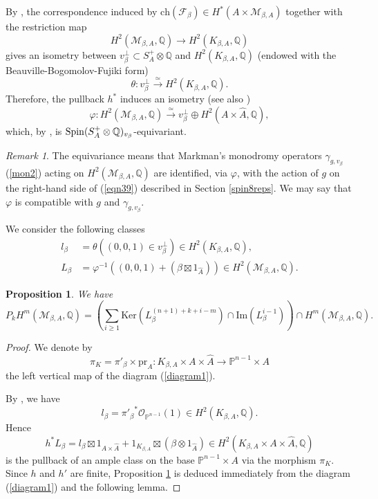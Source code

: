 \documentclass[11pt]{amsart}
\theoremstyle{plain}
\newtheorem{prop}[thm]{Proposition}
\theoremstyle{definition}
\theoremstyle{remark}
\newtheorem{rmk}[thm]{Remark}
\newcommand{\BP}{{\mathbb{P}}}
\newcommand{\BQ}{{\mathbb{Q}}}
\newcommand{\CF}{{\mathcal F}}
\newcommand{\CM}{{\mathcal M}}
\newcommand{\CO}{{\mathcal O}}
\begin{document}
By \cite[Theorem 0.1 and (1.6)]{Yo}, the correspondence induced by $\mathrm{ch}(\CF_\beta) \in H^*(A \times \CM_{\beta,A})$ together with the restriction map
\[
H^2(\CM_{\beta,A}, \BQ) \to H^2(K_{\beta,A}, \BQ)
\]
gives an isometry between $v_\beta^\perp \subset S_A^+\otimes \BQ$ and $H^2(K_{\beta,A}, \BQ)$  (endowed with the Beauville-Bogomolov-Fujiki form)
\[
\theta: v_\beta^\perp  \xrightarrow{\simeq}  H^2(K_{\beta,A}, \BQ).
\]
{Therefore, the pullback $h^*$ induces an isometry 
 (see also \cite[Theorem 4.1.(3) eq. (4.3)]{Yo})}
\begin{equation}\label{eqn39}
\varphi: H^2(\CM_{\beta, A}, \BQ) \xrightarrow{\simeq} v_\beta^\perp \oplus H^2(A\times \hat{A}, \BQ),
\end{equation}
which, by \cite[Section 8]{Markman2}, is  ${\rm Spin} (S_A^+\otimes \BQ)_{v_\beta}$-equivariant.
{
\begin{rmk}\label{compatibilityspin} The equivariance means  that 
Markman's monodromy operators $\gamma_{g,v_\beta}$ (\ref{mon2}) acting on 
$H^2(\CM_{\beta, A}, \BQ)$ are identified, via $\varphi$, with the action of $g$ on the
right-hand side of (\ref{eqn39})  described in Section \ref{spin8reps}. We may say that $\varphi$ is compatible with $g$ and $\gamma_{g,v_\beta}$.
\end{rmk}
}

We consider the following classes 
\begin{equation}\label{Lbeta}
\begin{split}
    l_\beta & = \theta\left((0,0,1)\in v_\beta^\perp\right) \in H^2(K_{\beta,A} ,\BQ), \\
    L_\beta & = \varphi^{-1} \left( (0,0,1) +  (\beta\boxtimes 1_{\hat{A}}) \right) \in H^2(\CM_{\beta, A}, \BQ).
\end{split}
\end{equation}

\begin{prop}\label{prop2.4}
We have  
\[
P_kH^m(\CM_{\beta,A}, \BQ) = \left(\sum_{i\geq 1} \mathrm{Ker}\left(L_\beta^{(n+1)+k+i-m}\right) \cap \mathrm{Im}(L_\beta^{i-1}) \right) \cap H^m(\CM_{\beta,A}, \BQ).
\]
\end{prop}

\begin{proof}
We denote by 
\[
\pi_K = \pi'_\beta \times \mathrm{pr}_A : K_{\beta, A} \times A \times \hat{A} \to \BP^{n-1}\times A
\]
the left vertical map of the diagram (\ref{diagram1}). 

By \cite[Example 3.1]{Markman4}, we have  
\[
l_\beta = {\pi'_\beta}^\ast \CO_{\BP^{n-1}}(1) \in H^2(K_{\beta,A}, \BQ).
\]
Hence 
\[
h^*L_\beta = l_\beta \boxtimes 1_{A\times\hat{A}}+ 1_{K_{\beta,A}}\boxtimes (\beta\otimes 1_{\hat{A}}) \in H^2(K_{\beta, A} \times A \times \hat{A},\BQ)
\]
is the pullback of an ample class on the base $\BP^{n-1}\times A$ via the morphism $\pi_K$. Since $h$ and $h'$ are finite, Proposition \ref{prop2.4} is deduced immediately from the diagram (\ref{diagram1}) and the following lemma.
\end{proof}
\end{document}
